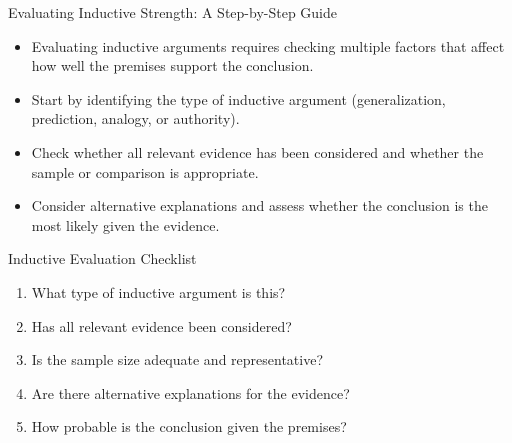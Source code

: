 \documentclass{beamer}
\begin{document}
\begin{frame}{Evaluating Inductive Strength: A Step-by-Step Guide}
	\begin{itemize}
		\item Evaluating inductive arguments requires checking multiple factors that affect how well the premises support the conclusion.
		\item Start by identifying the type of inductive argument (generalization, prediction, analogy, or authority).
		\item Check whether all relevant evidence has been considered and whether the sample or comparison is appropriate.
		\item Consider alternative explanations and assess whether the conclusion is the most likely given the evidence.
	\end{itemize}
	
	\begin{block}{Inductive Evaluation Checklist}
		\begin{enumerate}
			\item What type of inductive argument is this?
			\item Has all relevant evidence been considered?
			\item Is the sample size adequate and representative?
			\item Are there alternative explanations for the evidence?
			\item How probable is the conclusion given the premises?
		\end{enumerate}
	\end{block}
\end{frame}
\end{document}
